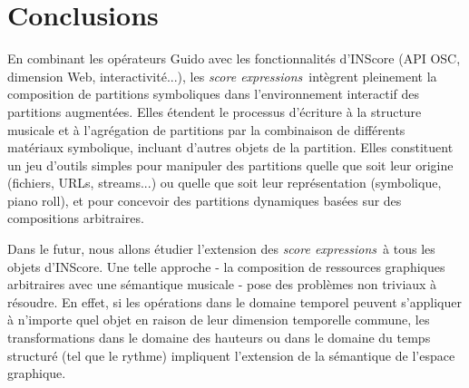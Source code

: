 \documentclass{article}
\newcommand{\sExprs}{\emph{score expressions}}
\begin{document}
\section{Conclusions}

En combinant les opérateurs Guido avec les fonctionnalités d'INScore (API OSC, dimension Web, interactivité...), les \sExprs\ intègrent pleinement la composition de partitions symboliques dans l'environnement interactif des partitions augmentées. Elles étendent le processus d'écriture à la structure musicale et à l'agrégation de partitions par la combinaison de différents matériaux symbolique, incluant d'autres objets de la partition. Elles constituent un jeu d'outils simples pour manipuler des partitions quelle que soit leur origine (fichiers, URLs, streams...) ou quelle que soit leur représentation (symbolique, piano roll), et pour concevoir des partitions dynamiques basées sur des compositions arbitraires.

Dans le futur, nous allons étudier l'extension des \sExprs\ à tous les objets d'INScore. Une telle approche - la composition de ressources graphiques arbitraires avec une sémantique musicale - pose des problèmes non triviaux à résoudre. En effet, si les opérations dans le domaine temporel peuvent s'appliquer à n'importe quel objet en raison de leur dimension temporelle commune, les transformations dans le domaine des hauteurs ou dans le domaine du temps structuré (tel que le rythme) impliquent l'extension de la sémantique de l'espace graphique.

\balance


\end{document}
